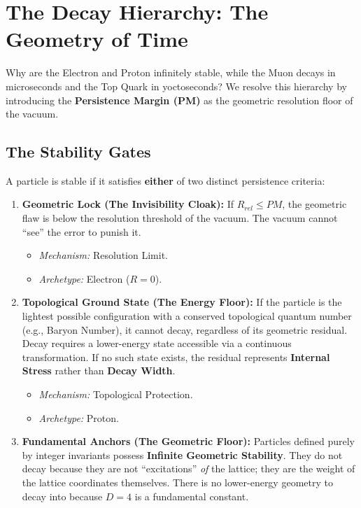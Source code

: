 \section*{The Decay Hierarchy: The Geometry of Time}

Why are the Electron and Proton infinitely stable, while the Muon decays in microseconds and the Top Quark in yoctoseconds? We resolve this hierarchy by introducing the \textbf{Persistence Margin (PM)} as the geometric resolution floor of the vacuum.

\subsection*{The Stability Gates}

A particle is stable if it satisfies \textbf{either} of two distinct persistence criteria:

\begin{enumerate}
    \item \textbf{Geometric Lock (The Invisibility Cloak):} If $R_{rel} \le PM$, the geometric flaw is below the resolution threshold of the vacuum. The vacuum cannot ``see'' the error to punish it.
    \begin{itemize}
        \item \textit{Mechanism:} Resolution Limit.
        \item \textit{Archetype:} Electron ($R=0$).
    \end{itemize}
    
    \item \textbf{Topological Ground State (The Energy Floor):} If the particle is the lightest possible configuration with a conserved topological quantum number (e.g., Baryon Number), it cannot decay, regardless of its geometric residual. Decay requires a lower-energy state accessible via a continuous transformation. If no such state exists, the residual represents \textbf{Internal Stress} rather than \textbf{Decay Width}.
    \begin{itemize}
        \item \textit{Mechanism:} Topological Protection.
        \item \textit{Archetype:} Proton.
    \end{itemize}
    
    \item \textbf{Fundamental Anchors (The Geometric Floor):} Particles defined purely by integer invariants possess \textbf{Infinite Geometric Stability}. They do not decay because they are not ``excitations'' \textit{of} the lattice; they are the weight of the lattice coordinates themselves. There is no lower-energy geometry to decay into because $D=4$ is a fundamental constant.
\end{enumerate}

